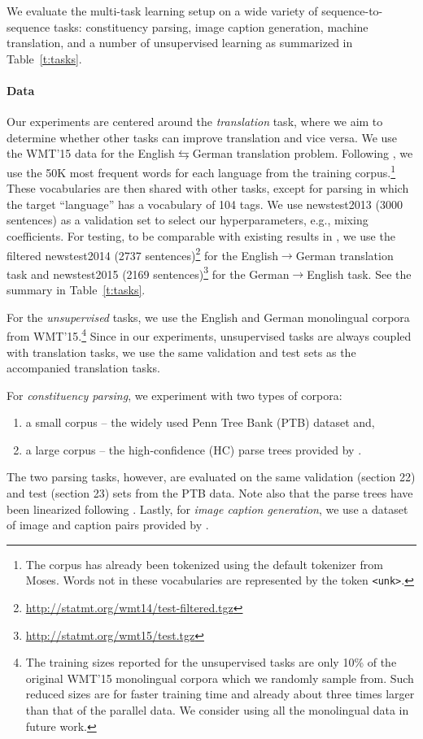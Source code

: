 We evaluate the multi-task learning setup on a wide variety of
sequence-to-sequence tasks: constituency parsing, image caption
generation, machine translation, and a number of unsupervised learning as
summarized in Table~\ref{t:tasks}.

\paragraph{Data}
Our experiments are centered around the {\it translation} task, where we aim to determine 
whether other tasks can improve translation and vice versa. We use the WMT'15 data
\citep{bojar15} for the English$\leftrightarrows$German
translation problem. Following 
\citet{luong15attn}, we use the 50K most frequent words for each
language from the training corpus.\footnote{The corpus has already been tokenized using the default
tokenizer from Moses.  Words not in these vocabularies are represented by the token
\texttt{<unk>}.} These vocabularies are then shared with other tasks, except for
parsing in which the target ``language'' has a vocabulary of 104 tags. 
We use newstest2013 (3000 sentences) as a validation set to select our
hyperparameters, e.g., mixing coefficients. For testing, to be comparable with existing results in
\citep{luong15attn}, we use the filtered
newstest2014 (2737
sentences)\footnote{\url{http://statmt.org/wmt14/test-filtered.tgz}} for the
English$\rightarrow$German translation task and newstest2015 (2169
sentences)\footnote{\url{http://statmt.org/wmt15/test.tgz}}
for the German$\rightarrow$English task.
See the summary in Table~\ref{t:tasks}.

For the {\it unsupervised} tasks, we use the English and German monolingual corpora
from WMT'15.\footnote{The training sizes reported for
the unsupervised tasks are
only 10\% of
the original WMT'15 monolingual corpora which we randomly sample from. Such reduced sizes are
for faster training time and already about three times larger than that of the parallel
data. We consider using all the monolingual data in future work.} Since in
our experiments, unsupervised tasks are always coupled with translation tasks,
we use the same validation and test sets as the accompanied translation tasks.

For {\it constituency parsing}, we experiment with two types of corpora:
\begin{enumerate}
\item a small corpus -- the widely used
Penn Tree Bank (PTB) dataset \citep{Marcus:1993:BLA} and,
\item a large corpus -- the high-confidence (HC) parse trees 
provided by \citet{vinyals15grammar}.
\end{enumerate}
The two parsing tasks, however, are evaluated on the same validation (section
22) and test (section 23)
sets from the PTB data. Note also that the parse trees have been linearized
following \citet{vinyals15grammar}. 
Lastly, for {\it image caption generation}, we use a dataset of image and caption pairs provided by
\citet{vinyals15caption}.


